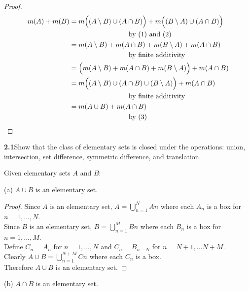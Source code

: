 \documentclass[12pt]{article}
\begin{document}
	\begin{proof}
		\begin{align*}
		m(A) + m(B) & = m\Big((A \setminus B) \cup (A \cap B)\Big) + m\Big((B \setminus A) \cup (A \cap B)\Big) \\
		& \hspace{20 ex} \text{by (1) and (2)} \\
		& = m(A \setminus B) + m(A \cap B) + m(B \setminus A) + m(A \cap B) \\
		& \hspace{20 ex} \text{by finite additivity} \\
		& = \Big( m(A \setminus B) + m(A \cap B) + m(B \setminus A) \Big) +  m(A \cap B) \\
		& = m\Big( (A \setminus B) \cup (A \cap B) \cup (B \setminus A) \Big) +  m(A \cap B)\\
		& \hspace{20 ex}  \text{by finite additivity} \\
		& = m(A \cup B) + m(A \cap B) \\
		& \hspace{20 ex} \text{by (3)}
		\end{align*}
	\end{proof}

\bigbreak
\bigbreak

	\hspace{-4 ex}\textbf{2.1}Show that the class of elementary sets is closed under the operations: union, intersection, set difference, symmetric difference, and translation. \bigbreak
	
	Given elementary sets $A$ and $B$: \bigbreak
	
	(a) $A \cup B$ is an elementary set.
	
	
	\begin{proof}
		Since $A$ is an elementary set, $A = \bigcup_{n=1}^{N} A{n}$ where each $A_{n}$ is a box for $n=1,...,N$. \\
		Since $B$ is an elementary set, $B = \bigcup_{n=1}^{M} B{n}$ where each $B_{n}$ is a box for $n=1,...,M$. \\
		Define $C_{n} = A_{n}$ for $n=1,...,N$ and $C_{n} = B_{n-N}$ for $n=N+1,...N+M$. \\
		Clearly $A \cup B = \bigcup_{n=1}^{N+M} C{n}$ where each $C_{n}$ is a box. \\
		Therefore $A \cup B$ is an elementary set.
	\end{proof}

	(b) $A \cap B$ is an elementary set. \bigbreak
	
\end{document}
